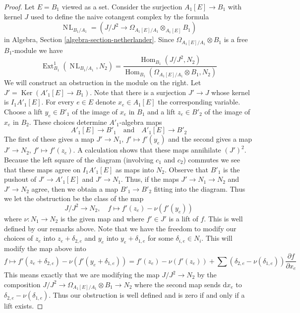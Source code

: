 \documentclass{stacks-project}
\theoremstyle{plain}
\theoremstyle{definition}
\theoremstyle{remark}
\numberwithin{equation}{subsection}
\def\Hom{\mathop{\mathrm{Hom}}\nolimits}
\def\Ext{\mathop{\mathrm{Ext}}\nolimits}
\def\NL{\mathop{N\!L}\nolimits}
\def\Ker{\mathop{\mathrm{Ker}}}
\begin{document}
\begin{proof}
Let $E = B_1$ viewed as a set.
Consider the surjection $A_1[E] \to B_1$ with kernel $J$ used
to define the naive cotangent complex by the formula
$$
\NL_{B_1/A_1} = (J/J^2 \to \Omega_{A_1[E]/A_1} \otimes_{A_1[E]} B_1)
$$
in
Algebra, Section \ref{algebra-section-netherlander}.
Since $\Omega_{A_1[E]/A_1} \otimes B_1$ is a free
$B_1$-module we have
$$
\Ext^1_{B_1}(\NL_{B_1/A_1}, N_2) =
\frac{\Hom_{B_1}(J/J^2, N_2)}
{\Hom_{B_1}(\Omega_{A_1[E]/A_1} \otimes B_1, N_2)}
$$
We will construct an obstruction in the module on the right.
Let $J' = \Ker(A'_1[E] \to B_1)$. Note that there is a surjection
$J' \to J$ whose kernel is $I_1A'_1[E]$.
For every $e \in E$ denote $x_e \in A_1[E]$ the corresponding variable.
Choose a lift $y_e \in B'_1$ of the image of $x_e$ in $B_1$ and
a lift $z_e \in B'_2$ of the image of $x_e$ in $B_2$.
These choices determine $A'_1$-algebra maps
$$
A'_1[E] \to B'_1 \quad\text{and}\quad A'_1[E] \to B'_2
$$
The first of these gives a map $J' \to N_1$, $f' \mapsto f'(y_e)$
and the second gives a map $J' \to N_2$, $f' \mapsto f'(z_e)$.
A calculation shows that these maps annihilate $(J')^2$.
Because the left square of the diagram (involving $c_1$ and $c_2$)
commutes we see that these maps agree on $I_1A'_1[E]$ as maps into $N_2$.
Observe that $B'_1$ is the pushout of $J' \to A'_1[E]$ and $J' \to N_1$. 
Thus, if the maps $J' \to N_1 \to N_2$ and $J' \to N_2$ agree, then we
obtain a map $B'_1 \to B'_2$ fitting into the diagram.
Thus we let the obstruction be the class of the map
$$
J/J^2 \to N_2,\quad f \mapsto f'(z_e) - \nu(f'(y_e))
$$
where $\nu : N_1 \to N_2$ is the given map and where $f' \in J'$
is a lift of $f$. This is well defined by our remarks above.
Note that we have the freedom
to modify our choices of $z_e$ into $z_e + \delta_{2, e}$
and $y_e$ into $y_e + \delta_{1, e}$ for some $\delta_{i, e} \in N_i$.
This will modify the map above into
$$
f \mapsto f'(z_e + \delta_{2, e}) - \nu(f'(y_e + \delta_{1, e})) =
f'(z_e) - \nu(f'(z_e)) +
\sum (\delta_{2, e} - \nu(\delta_{1, e}))\frac{\partial f}{\partial x_e}
$$
This means exactly that we are modifying the map $J/J^2 \to N_2$
by the composition $J/J^2 \to \Omega_{A_1[E]/A_1} \otimes B_1 \to N_2$
where the second map sends $\text{d}x_e$ to
$\delta_{2, e} - \nu(\delta_{1, e})$. Thus our obstruction is well defined
and is zero if and only if a lift exists.


\end{proof}
\end{document}
